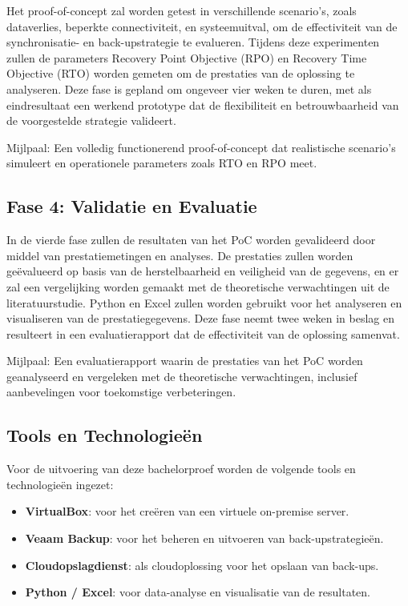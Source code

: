 Het proof-of-concept zal worden getest in verschillende scenario's, zoals dataverlies, beperkte connectiviteit, en systeemuitval, om de effectiviteit van de synchronisatie- en back-upstrategie te evalueren. Tijdens deze experimenten zullen de parameters Recovery Point Objective (RPO) en Recovery Time Objective (RTO) worden gemeten om de prestaties van de oplossing te analyseren. Deze fase is gepland om ongeveer vier weken te duren, met als eindresultaat een werkend prototype dat de flexibiliteit en betrouwbaarheid van de voorgestelde strategie valideert.

Mijlpaal: Een volledig functionerend proof-of-concept dat realistische scenario’s simuleert en operationele parameters zoals RTO en RPO meet.

\subsection{Fase 4: Validatie en Evaluatie}
In de vierde fase zullen de resultaten van het PoC worden gevalideerd door middel van prestatiemetingen en analyses. De prestaties zullen worden geëvalueerd op basis van de herstelbaarheid en veiligheid van de gegevens, en er zal een vergelijking worden gemaakt met de theoretische verwachtingen uit de literatuurstudie. Python en Excel zullen worden gebruikt voor het analyseren en visualiseren van de prestatiegegevens. Deze fase neemt twee weken in beslag en resulteert in een evaluatierapport dat de effectiviteit van de oplossing samenvat.

Mijlpaal: Een evaluatierapport waarin de prestaties van het PoC worden geanalyseerd en vergeleken met de theoretische verwachtingen, inclusief aanbevelingen voor toekomstige verbeteringen.

\subsection{Tools en Technologieën}
Voor de uitvoering van deze bachelorproef worden de volgende tools en technologieën ingezet:
\begin{itemize}
    \item \textbf{VirtualBox}: voor het creëren van een virtuele on-premise server.
    \item \textbf{Veaam Backup}: voor het beheren en uitvoeren van back-upstrategieën.
    \item \textbf{Cloudopslagdienst}: als cloudoplossing voor het opslaan van back-ups.
    \item \textbf{Python / Excel}: voor data-analyse en visualisatie van de resultaten.
\end{itemize}

